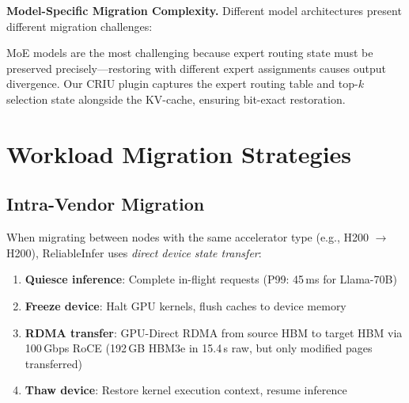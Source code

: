 \documentclass[conference,10pt,letterpaper]{IEEEtran}
\begin{document}
\textbf{Model-Specific Migration Complexity.} Different model architectures present different migration challenges:

\begin{table}[!t]
\caption{Migration Complexity by Model Architecture}
\label{tab:modelarch}
\centering\scriptsize
{}
\end{table}

MoE models are the most challenging because expert routing state must be preserved precisely---restoring with different expert assignments causes output divergence. Our CRIU plugin captures the expert routing table and top-$k$ selection state alongside the KV-cache, ensuring bit-exact restoration.

\section{Workload Migration Strategies}
\label{sec:migration}

\subsection{Intra-Vendor Migration}

When migrating between nodes with the same accelerator type (e.g., H200 $\to$ H200), ReliableInfer uses \emph{direct device state transfer}:

\begin{enumerate}
\item \textbf{Quiesce inference}: Complete in-flight requests (P99: 45\,ms for Llama-70B)
\item \textbf{Freeze device}: Halt GPU kernels, flush caches to device memory
\item \textbf{RDMA transfer}: GPU-Direct RDMA from source HBM to target HBM via 100\,Gbps RoCE (192\,GB HBM3e in 15.4\,s raw, but only modified pages transferred)
\item \textbf{Thaw device}: Restore kernel execution context, resume inference
\end{enumerate}
\end{document}

